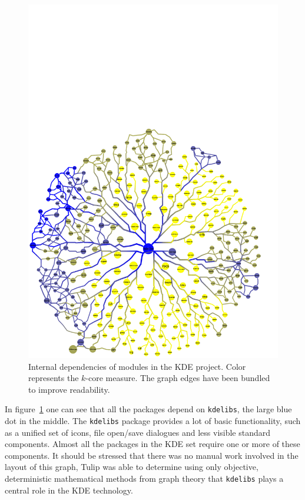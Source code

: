 \documentclass[smallextended,final]{svjour3}
\begin{document}
\begin{figure}
\small\centering
\includegraphics[clip,trim=0 0 1cm 10cm,width=\linewidth]{kde.pdf}
\caption{Internal dependencies of modules in the KDE project. Color represents the $k$-core measure. The graph edges have been bundled to improve readability.}\label{fig:kde2}
\end{figure}

In figure~\ref{fig:kde2} one can see that all the packages depend on \verb|kdelibs|, the large blue dot in the middle. The \verb|kdelibs| package provides a lot of basic functionality, such as a unified set of icons, file open/save dialogues and less visible standard components. Almost all the packages in the KDE set require one or more of these components. It should be stressed that there was no manual work involved in the layout of this graph, Tulip was able to determine using only objective, deterministic mathematical methods from graph theory that \verb|kdelibs| plays a central role in the KDE technology.
\end{document}
